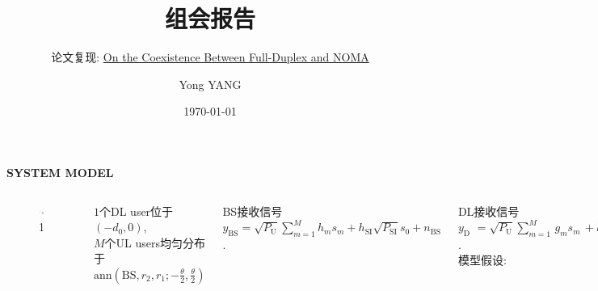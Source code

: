 \documentclass[aspectratio=169]{beamer}
\title{组会报告} %
\subtitle{论文复现: \href{https://ieeexplore.ieee.org/document/8306094}{On the Coexistence Between Full-Duplex and NOMA}}
\author[Yong YANG]{Yong YANG}
\institute[BUPT]{
	Beijing University of Posts and Telecommunications\\
	\url{https://bupt-yy.github.io/}
}
\date{\today}
\begin{document}
	
	\frame{\titlepage}

\begin{frame}{\textbf{{\LARGE{S}}YSTEM {\LARGE{M}}ODEL}}
	
	\begin{columns}
	\begin{figure}
		\centering
		\includegraphics[width=1\linewidth]{images/fig1.pdf}
		\caption{1}
		\label{fig:fig1}
	\end{figure}
	
	$1$个DL user位于$(-d_0,0)$, \\$M$个UL users均匀分布于$\mathrm{ann}(\text{BS},r_2,r_1;-\frac{\theta}{2},\frac{\theta}{2})$
	
	BS接收信号$y_{\text{BS}} = \sqrt{P_\text{U}}\sum_{m = 1}^{M}h_ms_m+h_{\text{SI}}\sqrt{P_{\text{SI}}}s_0+n_{\text{BS}}$.
	
	DL接收信号$y_{\text{D}}\,\, =  \sqrt{P_{\text{U}}}\sum_{m = 1}^M \,g_ms_m\,+h_0\sqrt{P_{\text{BS}}}s_0+n_{\text{D}}$.
	\\[10pt]
	模型假设: \begin{itemize}
		\item UL users的发射功率$P_{\text{U}}$均相同, 
		\item $h_{\text{SI}}\sim\mathcal{CN}(0,1)$,
		\item $h_m\sim$ Rayleigh fading.
	\end{itemize}
	
	
	 
	\end{columns}
\end{frame}
\end{document}
